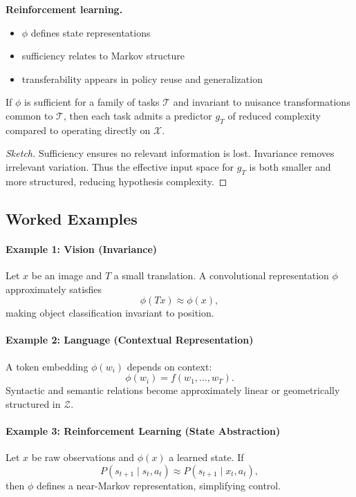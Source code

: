 \noindent
\textbf{Reinforcement learning.}
\begin{itemize}
\item $\phi$ defines state representations
\item sufficiency relates to Markov structure
\item transferability appears in policy reuse and generalization
\end{itemize}

\begin{proposition}
If $\phi$ is sufficient for a family of tasks $\mathcal{T}$ and invariant to nuisance transformations common to $\mathcal{T}$, then each task admits a predictor $g_T$ of reduced complexity compared to operating directly on $\mathcal{X}$.
\end{proposition}

\begin{proof}[Sketch]
Sufficiency ensures no relevant information is lost.  
Invariance removes irrelevant variation.  
Thus the effective input space for $g_T$ is both smaller and more structured, reducing hypothesis complexity.
\end{proof}

\subsection{Worked Examples}

\paragraph{Example 1: Vision (Invariance)}
Let $x$ be an image and $T$ a small translation.  
A convolutional representation $\phi$ approximately satisfies
\[
\phi(Tx) \approx \phi(x),
\]
making object classification invariant to position.

\paragraph{Example 2: Language (Contextual Representation)}
A token embedding $\phi(w_i)$ depends on context:
\[
\phi(w_i) = f(w_1, \dots, w_T).
\]
Syntactic and semantic relations become approximately linear or geometrically structured in $\mathcal{Z}$.

\paragraph{Example 3: Reinforcement Learning (State Abstraction)}
Let $x$ be raw observations and $\phi(x)$ a learned state.  
If
\[
P(s_{t+1} \mid s_t, a_t) \approx P(s_{t+1} \mid x_t, a_t),
\]
then $\phi$ defines a near-Markov representation, simplifying control.

